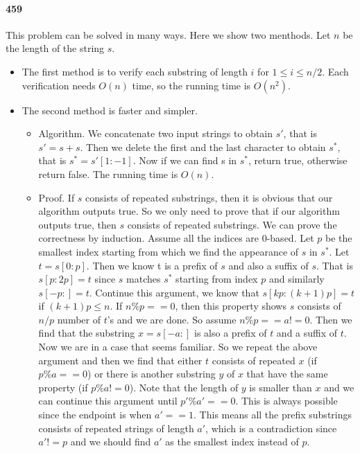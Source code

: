\documentclass[11pt]{article}
\begin{document}
\paragraph{459}
This problem can be solved in many ways. Here we show two menthods. Let $n$ be the length of the string $s$.
\begin{itemize}
\item The first method is to verify each substring of length $i$ for $1 \le i \le n/2$. Each verification needs $O(n)$ time,
so the running time is $O(n^2)$.
\item The second method is faster and simpler. 
\begin{itemize}
\item Algorithm. We concatenate two input strings to obtain $s'$, that is $s' = s + s$.
Then we delete the first and the last character to obtain $s^*$, that is $s^* = s'[1:-1]$. Now if we can find s in $s^*$,
return true, otherwise return false. The running time is $O(n)$. 
\item Proof. If $s$ consists of repeated substrings, then it is obvious that our algorithm outputs true. So we only need 
to prove that if our algorithm outputs true, then $s$ consists of repeated substrings. We can prove the correctness by 
induction. Assume all the indices are 0-based. Let $p$ be the smallest index starting from which we find the appearance of 
$s$ in $s^*$. Let $t = s[0:p]$. Then we know t is a prefix of $s$ and also a suffix of $s$. That is $s[p:2p] = 
t$ since $s$ matches $s^*$ starting from index $p$ and similarly $s[-p:] = t$. Continue this argument, we know that
$s[kp:(k+1)p] = t$ if $(k+1)p \le n$. If $n \% p == 0$, then this property shows $s$ consists of $n/p$ number of $t$'s 
and we are done. So assume $n \% p == a != 0$. Then we find that the substring $x = s[-a:]$ is also a prefix of $t$ and a 
suffix of $t$. Now we are in a case that seems familiar. So we repeat the above argument and then we find that either $t$ 
consists of repeated $x$ (if $p \% a == 0$) or there is another substring $y$ of $x$ that have the same property (if $p \% a
!= 0$). Note that the length of $y$ is smaller than $x$ and we can continue this argument until $p' \% a' == 0$. This is 
always possible since the endpoint is when $a' == 1$. This means all the prefix substrings consists of repeated strings of 
length $a'$, which is a contradiction since $a' != p$ and we should find $a'$ as the smallest index instead of $p$.
\end{itemize}


\end{itemize}
\end{document}
